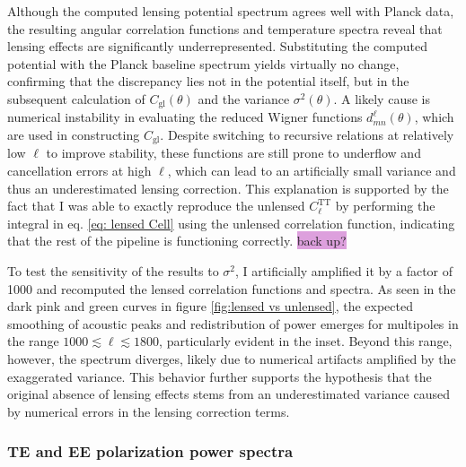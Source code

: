 \documentclass{aa}
\numberwithin{equation}{section}
\numberwithin{table}{section}
\numberwithin{figure}{section}
\begin{document}
Although the computed lensing potential spectrum agrees well with Planck data, the resulting angular correlation functions and temperature spectra reveal that lensing effects are significantly underrepresented. Substituting the computed potential with the Planck baseline spectrum yields virtually no change, confirming that the discrepancy lies not in the potential itself, but in the subsequent calculation of $C_\text{gl}(\theta)$ and the variance $\sigma^2(\theta)$. A likely cause is numerical instability in evaluating the reduced Wigner functions $d^\ell_{mn}(\theta)$, which are used in constructing $C_\text{gl}$. Despite switching to recursive relations at relatively low $\ell$ to improve stability, these functions are still prone to underflow and cancellation errors at high $\ell$, which can lead to an artificially small variance and thus an underestimated lensing correction. This explanation is supported by the fact that I was able to exactly reproduce the unlensed $C_\ell^\text{TT}$ by performing the integral in eq. \eqref{eq: lensed Cell} using the unlensed correlation function, indicating that the rest of the pipeline is functioning correctly. \colorbox{Plum}{back up?}

To test the sensitivity of the results to $\sigma^2$, I artificially amplified it by a factor of 1000 and recomputed the lensed correlation functions and spectra. As seen in the dark pink and green curves in figure \ref{fig:lensed vs unlensed}, the expected smoothing of acoustic peaks and redistribution of power emerges for multipoles in the range $1000 \lesssim \ell \lesssim 1800$, particularly evident in the inset. Beyond this range, however, the spectrum diverges, likely due to numerical artifacts amplified by the exaggerated variance. This behavior further supports the hypothesis that the original absence of lensing effects stems from an underestimated variance caused by numerical errors in the lensing correction terms.





\subsubsection{TE and EE polarization power spectra}\label{subsubsec: IV results pol}
\end{document}
